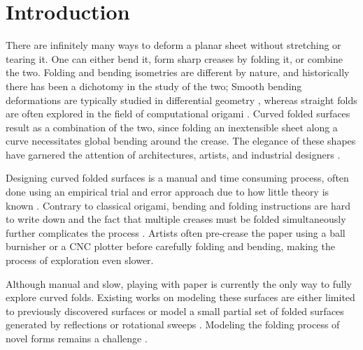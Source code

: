 \section{Introduction}
There are infinitely many ways to deform a planar sheet without stretching or tearing it. One can either bend it, form sharp creases by folding it, or combine the two. Folding and bending isometries are different by nature, and historically there has been a dichotomy in the study of the two; Smooth bending deformations are typically studied in differential geometry \cite{do_carmo}, whereas straight folds are often explored in the field of computational origami \cite{origami_book}. Curved folded surfaces \cite{huffman} result as a combination of the two, since folding an inextensible sheet along a curve necessitates global bending around the crease. The elegance of these shapes have garnered the attention of architectures, artists, and industrial designers \cite{arch_geom,tachi2013composite,tachi2011one,buri2011curved,robofold,curved_review}.

Designing curved folded surfaces is a manual and time consuming process, often done using an empirical trial and error approach due to how little theory is known \cite{curved_review,huffmann_reconstructing}. Contrary to classical origami, bending and folding instructions are hard to write down and the fact that multiple creases must be folded simultaneously further complicates the process \cite{StringActuated:2017}. Artists often pre-crease the paper using a ball burnisher or a CNC plotter before carefully folding and bending, making the process of exploration even slower. 

Although manual and slow, playing with paper is currently the only way to fully explore curved folds. Existing works on modeling these surfaces are either limited to previously discovered surfaces \cite{curved_folding_kilian,StringActuated:2017} or model a small partial set of folded surfaces generated by reflections or rotational sweeps \cite{Mitani_ref,mitani2009design}. Modeling the folding process of novel forms remains a challenge \cite{curved_review}. 

